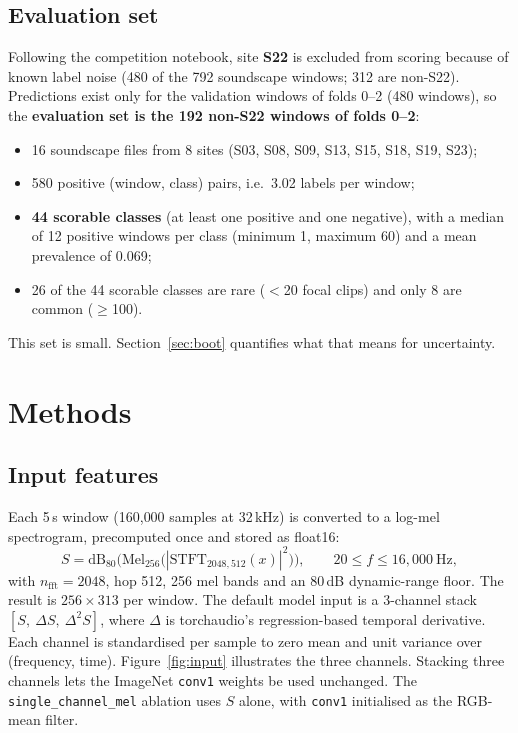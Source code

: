 \documentclass[11pt]{article}
\newcommand{\var}[1]{\texttt{#1}}
\begin{document}
\subsection{Evaluation set}
\label{sec:evalset}
Following the competition notebook, site \textbf{S22} is excluded from scoring
because of known label noise (480 of the 792 soundscape windows; 312 are
non-S22). Predictions exist only for the validation windows of folds 0--2 (480
windows), so the \textbf{evaluation set is the 192 non-S22 windows of folds
0--2}:
\begin{itemize}
  \item 16 soundscape files from 8 sites (S03, S08, S09, S13, S15, S18, S19,
        S23);
  \item 580 positive (window, class) pairs, i.e.\ 3.02 labels per window;
  \item \textbf{44 scorable classes} (at least one positive and one
        negative), with a median of 12 positive windows per class (minimum 1,
        maximum 60) and a mean prevalence of 0.069;
  \item 26 of the 44 scorable classes are rare ($<$20 focal clips) and only 8
        are common ($\ge$100).
\end{itemize}
This set is small. Section~\ref{sec:boot} quantifies what that means for
uncertainty.

\section{Methods}
\label{sec:methods}

\subsection{Input features}
Each 5\,s window (160{,}000 samples at 32\,kHz) is converted to a log-mel
spectrogram, precomputed once and stored as float16:
\begin{equation}
  S=\mathrm{dB}_{80}\!\Big(\mathrm{Mel}_{256}\big(|\mathrm{STFT}_{2048,512}(x)|^2\big)\Big),
  \qquad 20\le f\le16{,}000~\text{Hz},
\end{equation}
with $n_{\text{fft}}=2048$, hop 512, 256 mel bands and an 80\,dB dynamic-range
floor. The result is $256\times313$ per window. The default model input is a
3-channel stack $[S,\ \Delta S,\ \Delta^2 S]$, where $\Delta$ is
torchaudio's regression-based temporal derivative. Each channel is
standardised per sample to zero mean and unit variance over
(frequency, time). Figure~\ref{fig:input} illustrates the three channels.
Stacking three channels lets the ImageNet \texttt{conv1} weights be used
unchanged. The \var{single\_channel\_mel} ablation uses $S$ alone, with
\texttt{conv1} initialised as the RGB-mean filter.
\end{document}
